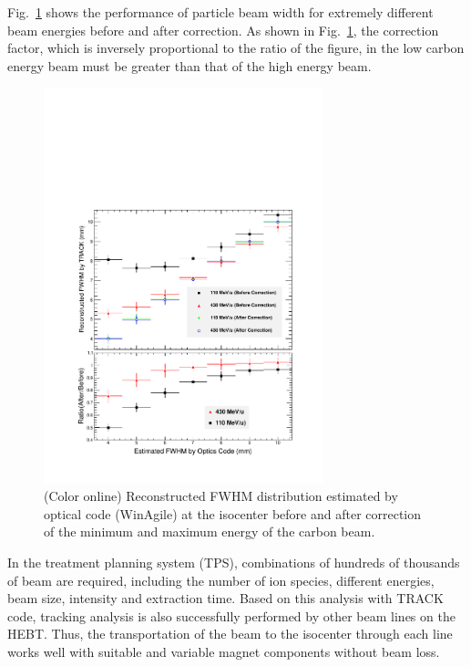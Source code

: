 \documentclass[jkps,preprint,fleqn,showpacs,showkeys,10pt,twocolumn]{revtex4}
\begin{document}
Fig.~\ref{fig8} shows the performance of particle beam width for extremely different beam energies before and after correction.
As shown in Fig.~\ref{fig8}, the correction factor, which is inversely proportional to the ratio of the figure, in the low carbon energy beam
must be greater than that of the high energy beam.
\begin{figure}[h]
  \begin{center}
    \includegraphics[width=8.1cm]{Fig07-1.pdf}
    \caption{(Color online) Reconstructed FWHM distribution estimated by optical code (WinAgile) at the isocenter before and after correction    
      of the minimum and maximum energy of the carbon beam.}
    \label{fig8}
  \end{center}
\end{figure}
In the treatment planning system (TPS), combinations of hundreds of thousands of beam are required,
including the number of ion species, different energies, beam size, intensity and extraction time.
Based on this analysis with TRACK code, tracking analysis is also successfully performed by other beam lines on the HEBT.
Thus, the transportation of the beam to the isocenter through each line works well with suitable and variable magnet components without beam loss.
\end{document}
